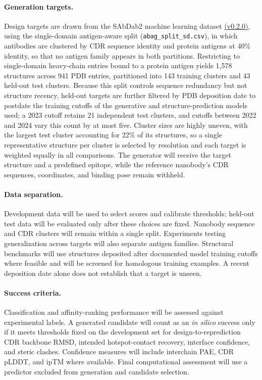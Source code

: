 \documentclass[11pt, logo, nonumbering]{preprint}
\begin{document}
\paragraph{Generation targets.}
Design targets are drawn from the SAbDab2 machine learning dataset \href{https://zenodo.org/records/22019991}{(v0.2.0)}, using the single-domain antigen-aware split (\texttt{abag\_split\_sd.csv}), in which antibodies are clustered by CDR sequence identity and protein antigens at 40\% identity, so that no antigen family appears in both partitions. Restricting to single-domain heavy-chain entries bound to a protein antigen yields 1{,}578 structures across 941 PDB entries, partitioned into 143 training clusters and 43 held-out test clusters. Because this split controls sequence redundancy but not structure recency, held-out targets are further filtered by PDB deposition date to postdate the training cutoffs of the generative and structure-prediction models used; a 2023 cutoff retains 21 independent test clusters, and cutoffs between 2022 and 2024 vary this count by at most five. Cluster sizes are highly uneven, with the largest test cluster accounting for 22\% of its structures, so a single representative structure per cluster is selected by resolution and each target is weighted equally in all comparisons. The generator will receive the target structure and a predefined epitope, while the reference nanobody's CDR sequences, coordinates, and binding pose remain withheld.

\paragraph{Data separation.}
Development data will be used to select scores and calibrate thresholds; held-out test data will be evaluated only after these choices are fixed. Nanobody sequence and CDR clusters will remain within a single split. Experiments testing generalization across targets will also separate antigen families. Structural benchmarks will use structures deposited after documented model training cutoffs where feasible and will be screened for homologous training examples. A recent deposition date alone does not establish that a target is unseen.

\paragraph{Success criteria.}
Classification and affinity-ranking performance will be assessed against experimental labels. A generated candidate will count as an \emph{in silico} success only if it meets thresholds fixed on the development set for design-to-reprediction CDR backbone RMSD, intended hotspot-contact recovery, interface confidence, and steric clashes. Confidence measures will include interchain PAE, CDR pLDDT, and ipTM where available. Final computational assessment will use a predictor excluded from generation and candidate selection.
\end{document}
